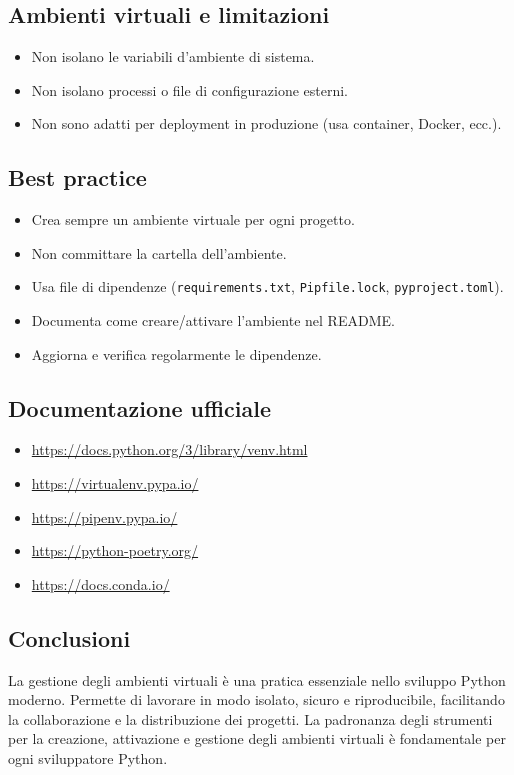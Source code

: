 \documentclass[a4paper,12pt]{article}
\begin{document}
\subsection*{Ambienti virtuali e limitazioni}
\begin{itemize}
    \item Non isolano le variabili d'ambiente di sistema.
    \item Non isolano processi o file di configurazione esterni.
    \item Non sono adatti per deployment in produzione (usa container, Docker, ecc.).
\end{itemize}

\subsection*{Best practice}
\begin{itemize}
    \item Crea sempre un ambiente virtuale per ogni progetto.
    \item Non committare la cartella dell'ambiente.
    \item Usa file di dipendenze (\texttt{requirements.txt}, \texttt{Pipfile.lock}, \texttt{pyproject.toml}).
    \item Documenta come creare/attivare l'ambiente nel README.
    \item Aggiorna e verifica regolarmente le dipendenze.
\end{itemize}

\subsection*{Documentazione ufficiale}
\begin{itemize}
    \item \url{https://docs.python.org/3/library/venv.html}
    \item \url{https://virtualenv.pypa.io/}
    \item \url{https://pipenv.pypa.io/}
    \item \url{https://python-poetry.org/}
    \item \url{https://docs.conda.io/}
\end{itemize}

\subsection*{Conclusioni}
La gestione degli ambienti virtuali è una pratica essenziale nello sviluppo Python moderno. Permette di lavorare in modo isolato, sicuro e riproducibile, facilitando la collaborazione e la distribuzione dei progetti. La padronanza degli strumenti per la creazione, attivazione e gestione degli ambienti virtuali è fondamentale per ogni sviluppatore Python.
\end{document}
